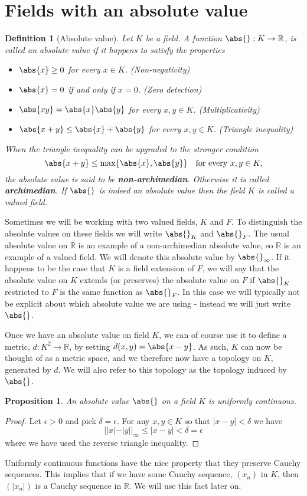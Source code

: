 \documentclass{article}
\newtheorem{definition}{Definition}[section]
\newtheorem{proposition}{Proposition}[section]
\newcommand{\mbb}[1]{\mathbb{#1}}
\begin{document}
\section{Fields with an absolute value}

\begin{definition}[Absolute value]
    Let $K$ be a field. A function $\abs{} : K \to \mbb R$, is called an absolute value if it happens to satisfy the properties
    \begin{itemize}
        \item $\abs{x} \geq 0$ for every $x \in K$. (Non-negativity)
        \item $\abs{x} = 0$ if and only if $x = 0$. (Zero detection)
        \item $\abs{xy} = \abs{x} \abs{y}$ for every $x,y \in K$. (Multiplicativity)
        \item $\abs{x + y} \leq \abs{x} + \abs{y}$ for every $x,y \in K$. (Triangle inequality)
    \end{itemize}
    When the triangle inequality can be upgraded to the stronger condition $$\abs{x + y} \leq \max \{\abs{x}, \abs{y}\} \quad \text{for every } x,y \in K,$$
    the absolute value is said to be \textbf{non-archimedian}. Otherwise it is called \textbf{archimedian}. If $\abs{}$ is indeed an absolute value then the field $K$ is called a valued field.
\end{definition}
Sometimes we will be working with two valued fields, $K$ and $F$. To distinguish the absolute values on these fields we will write $\abs{}_K$ and $\abs{}_F$. The usual absolute value on $\mbb R$ is an example of a non-archimedian absolute value, so $\mbb R$ is an example of a valued field. We will denote this absolute value by $\abs{}_\infty$. If it happens to be the case that $K$ is a field extension of $F$, we will say that the absolute value on $K$ extends (or preserves) the absolute value on $F$ if $\abs{}_K$ restricted to $F$ is the same function as $\abs{}_F$. In this case we will typically not be explicit about which absolute value we are using - instead we will just write $\abs{}$.


Once we have an absolute value on field $K$, we can of course use it to define a metric, $d : K^2 \to \mbb R$, by setting $d(x,y) = \abs{x - y}$. As such, $K$ can now be thought of as a metric space, and we therefore now have a topology on $K$, generated by $d$. We will also refer to this topology as the topology induced by $\abs{}$.

\begin{proposition}
    An absolute value $\abs{}$ on a field $K$ is uniformly continuous.  
\end{proposition}
\begin{proof}
    Let $\epsilon > 0$ and pick $\delta = \epsilon$. For any $x,y \in K$ so that $|x - y| < \delta$ we have 
    $$||x| - |y||_\infty \leq |x - y| < \delta = \epsilon$$
    where we have used the reverse triangle inequality. 
\end{proof}
Uniformly continuous functions have the nice property that they preserve Cauchy sequences. This implies that if we have some Cauchy sequence, $(x_n)$ in $K$, then $(|x_n|)$ is a Cauchy sequence in $\mbb R$. We will use this fact later on.
\end{document}
